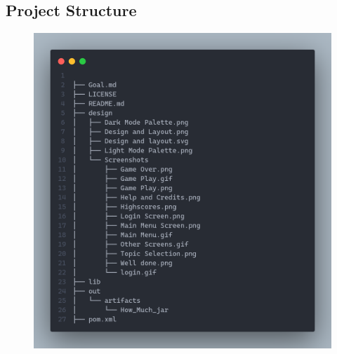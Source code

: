 \documentclass[11pt]{article}
\begin{document}
\subsection{Project Structure}
\begin{figure}[H]
	\centering
	\includegraphics[scale=0.3]{code.png}
	\caption{}
\end{figure}
\end{document}
